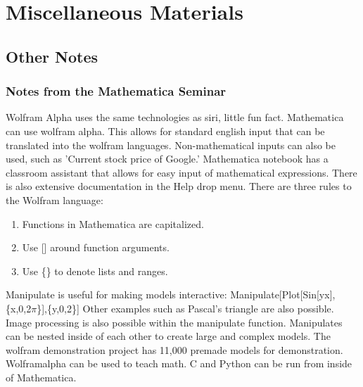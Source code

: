 \documentclass[crop=false,class=article,oneside]{standalone}
\begin{document}
    \ifx\ifphysicscourseselectromagnetismI\undefined
        \section*{Miscellaneous Materials}
        \setcounter{section}{1}
    \fi
    \subsection{Other Notes}
        \subsubsection{Notes from the Mathematica Seminar}
            Wolfram Alpha uses the same technologies as siri,
            little fun fact. Mathematica can use wolfram alpha.
            This allows for standard english input that can be
            translated into the wolfram languages.
            Non-mathematical inputs can also be used, such as
            'Current stock price of Google.'
            Mathematica notebook has a classroom assistant
            that allows for easy input of mathematical
            expressions. There is also extensive documentation
            in the Help drop menu. There are three rules to
            the Wolfram language:
            \begin{enumerate}
                \item Functions in Mathematica are capitalized.
                \item Use [] around function arguments.
                \item Use \{\} to denote lists and ranges.
            \end{enumerate}
            Manipulate is useful for making models interactive:
            Manipulate[Plot[Sin[yx],\{x,0,2$\pi$\}],\{y,0,2\}]
            Other examples such as Pascal's triangle are also
            possible. Image processing is also possible within
            the manipulate function. Manipulates can be nested
            inside of each other to create large and complex
            models. The wolfram demonstration project has 11,000
            premade models for demonstration. Wolframalpha can
            be used to teach math. C and Python can be run
            from inside of Mathematica.
\end{document}
